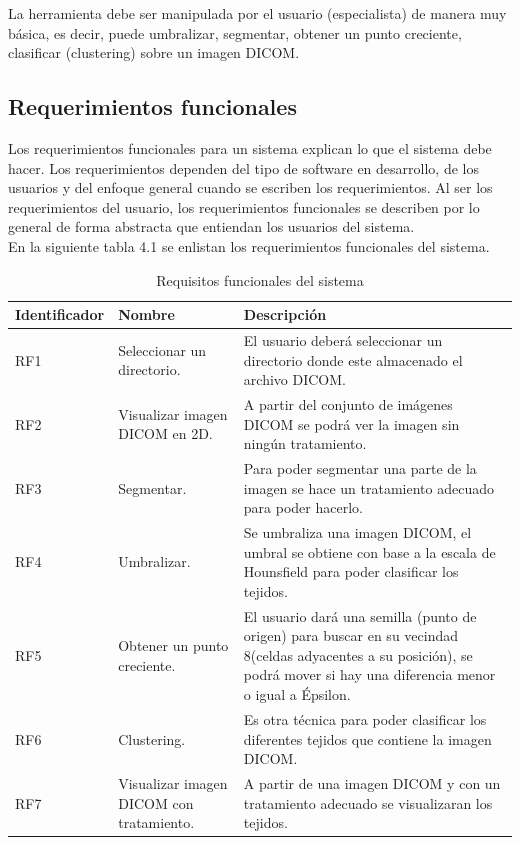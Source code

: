 \documentclass[12pt]{report}
\begin{document}
La herramienta debe ser manipulada por el usuario (especialista) de manera muy básica, es decir, puede umbralizar, segmentar, obtener un punto creciente, clasificar (clustering) sobre un imagen DICOM.
\subsection{Requerimientos funcionales}
Los requerimientos funcionales para un sistema explican lo que el sistema debe hacer. Los requerimientos dependen del tipo de software en desarrollo, de los usuarios y del enfoque general cuando se escriben los requerimientos. Al ser los requerimientos del usuario, los requerimientos funcionales se describen por lo general de forma abstracta que entiendan los usuarios del sistema. \cite{isRF}\\ 

En la siguiente tabla 4.1 se enlistan los requerimientos funcionales del sistema.\\ 

\begin{table}[H]
\begin{center}
\begin{tabular}{|p{23mm}|p{35mm}|p{75mm}|}
\hline
 Identificador & Nombre & Descripción \\
\hline \hline 
RF1 & Seleccionar un directorio. & El usuario deberá seleccionar un directorio donde este almacenado el archivo DICOM.\\
\hline
RF2 & Visualizar imagen DICOM en 2D. & A partir del conjunto de imágenes DICOM se podrá ver la imagen sin ningún tratamiento.  \\
\hline
RF3 & Segmentar. & Para poder segmentar una parte de la imagen se hace un tratamiento adecuado para poder hacerlo.  \\
\hline
RF4 & Umbralizar. & Se umbraliza una imagen DICOM, el umbral se obtiene con base a la escala de Hounsfield para poder clasificar los tejidos.  \\
\hline
RF5 & Obtener un punto creciente. & El usuario dará una semilla (punto de origen) para buscar en su vecindad 8(celdas adyacentes a su posición), se podrá mover si hay una diferencia menor o igual a Épsilon. \\
\hline
RF6 & Clustering. & Es otra técnica para poder clasificar los diferentes tejidos que contiene la imagen DICOM. \\
\hline
RF7 & Visualizar imagen DICOM con tratamiento. & A partir de una imagen DICOM y con un tratamiento adecuado se visualizaran los tejidos.\\
\hline
\end{tabular}
\caption{Requisitos funcionales del sistema}
\end{center}
\end{table}
\end{document}
